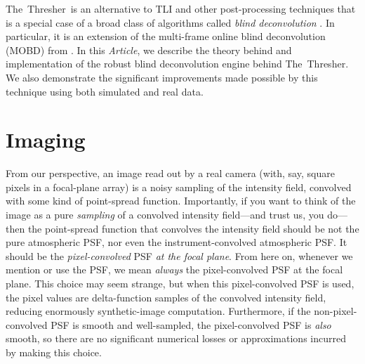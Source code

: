 \documentclass[12pt,preprint]{aastex}
\newcommand{\project}[1]{{\sffamily #1}}
\newcommand{\TheThresher}{\project{The~Thresher}}
\newcommand{\documentname}{\textsl{Article}}
\newcommand{\sectlabel}[1]{\label{sect:#1}}
\begin{document}
\TheThresher\ is an alternative to TLI and other post-processing
techniques that is a special case of a broad class of algorithms
called \emph{blind deconvolution} \citep{ayers}. In particular, it
is an extension of the multi-frame online blind deconvolution (MOBD)
from \citet{hirsch}. In this \documentname, we describe the theory
behind and implementation of the robust blind deconvolution engine
behind \TheThresher. We also demonstrate the significant improvements
made possible by this technique using both simulated and real data.

\section{Imaging} \sectlabel{imaging}

From our perspective, an image read out by a real camera (with, say,
square pixels in a focal-plane array) is a noisy sampling of the
intensity field, convolved with some kind of point-spread function.
Importantly, if you want to think of the image as a pure
\emph{sampling} of a convolved intensity field---and trust us, you
do---then the point-spread function that convolves the intensity field
should be not the pure atmospheric PSF, nor even the
instrument-convolved atmospheric PSF.  It should be the
\emph{pixel-convolved} PSF \emph{at the focal plane}.  From here on,
whenever we mention or use the PSF, we mean \emph{always} the
pixel-convolved PSF at the focal plane.  This choice may seem strange,
but when this pixel-convolved PSF is used, the pixel values are
delta-function samples of the convolved intensity field, reducing
enormously synthetic-image computation.  Furthermore, if the
non-pixel-convolved PSF is smooth and well-sampled, the
pixel-convolved PSF is \emph{also} smooth, so there are no significant
numerical losses or approximations incurred by making this choice.

\end{document}
